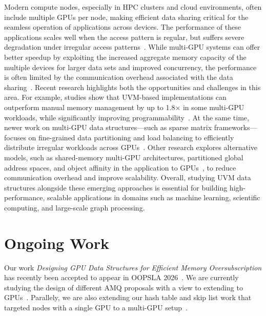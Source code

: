 \documentclass[12pt,a4paper]{article}
\begin{document}

Modern compute nodes, especially in HPC clusters and cloud environments, often include multiple GPUs per node, making efficient data sharing critical for the seamless operation of applications across devices.
The performance of these applications scales well when the access pattern is regular, but suffers severe degradation under irregular access patterns~\cite {gpu-ovs-ds-oopsla-2026,glift-tog-2006}.
While multi-GPU systems can offer better speedup by exploiting the increased aggregate memory capacity of the multiple devices for larger data sets and improved concurrency, the performance is often limited by the communication overhead associated with the data sharing~\cite{gpusm-gpgpuw-2015,multi-gpu-spmv-taco-2024,multigpu-comm-js-2018}.
Recent research highlights both the opportunities and challenges in this area. For example, studies show that UVM-based implementations can outperform manual memory management by up to 1.8× in some multi-GPU workloads, while significantly improving programmability~\cite{multi-gpu-nas-2021}.
At the same time, newer work on multi-GPU data structures—such as sparse matrix frameworks—focuses on fine-grained data partitioning and load balancing to efficiently distribute irregular workloads across GPUs~\cite{multi-gpu-spmv-taco-2024}.
Other research explores alternative models, such as shared-memory multi-GPU architectures, partitioned global address spaces, and object affinity in the application to GPUs~\cite{oasis-hpca-2025}, to reduce communication overhead and improve scalability.
Overall, studying UVM data structures alongside these emerging approaches is essential for building high-performance, scalable applications in domains such as machine learning, scientific computing, and large-scale graph processing.

\section*{Ongoing Work}

Our work \textit{Designing GPU Data Structures for Efficient Memory Oversubscription} has recently been accepted to appear in OOPSLA 2026~\cite{gpu-ovs-ds-oopsla-2026}. We are currently studying the design of different AMQ proposals with a view to extending to GPUs~\cite{aqf-sigmod,gpu-filters-ppopp23,quotient-filter}. Parallely, we are also extending our hash table and skip list work that targeted nodes with a single GPU to a multi-GPU setup~\cite{warpdrive}.

\clearpage

{\scriptsize
    
    
}
\end{document}
